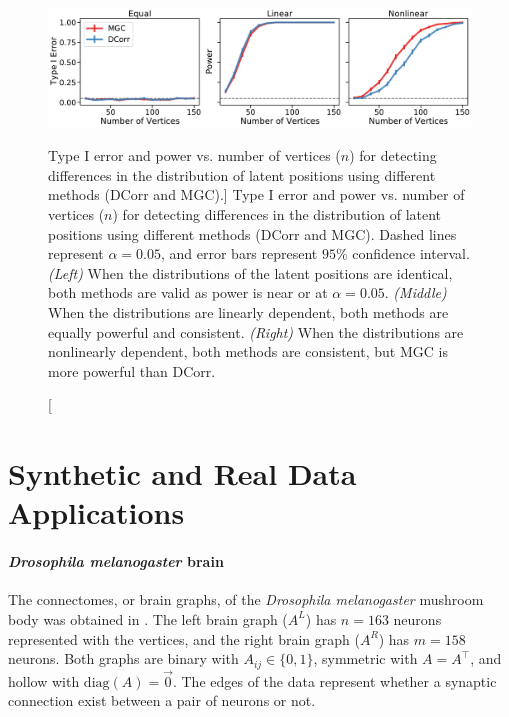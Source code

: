 \begin{figure}[hbt!]
    \centering
    \includegraphics[width=\linewidth]{figures/nonpar/simulations.pdf}
    \caption
    [Type I error and power vs. number of vertices ($n$) for detecting differences in the distribution of latent positions using different methods (DCorr and MGC).]
    {Type I error and power vs. number of vertices ($n$) for detecting differences in the distribution of latent positions using different methods (DCorr and MGC). Dashed lines represent $\alpha=0.05$, and error bars represent $95\%$ confidence interval.
    \textit{(Left)} When the distributions of the latent positions are identical, both methods are valid as power is near or at $\alpha=0.05$. \textit{(Middle)} When the distributions are linearly dependent, both methods are equally powerful and consistent. \textit{(Right)} When the distributions are nonlinearly dependent, both methods are consistent, but MGC is more powerful than DCorr.}
    \label{fig:simulations}
\end{figure}

\section{Synthetic and Real Data Applications}

\paragraph{\textit{Drosophila melanogaster} brain}
The connectomes, or brain graphs, of the \textit{Drosophila melanogaster} mushroom body was obtained in \cite{eichler2017complete}. The left brain graph ($A^L$) has $n=163$ neurons represented with the vertices, and the right brain graph ($A^R$) has $m=158$ neurons. Both graphs are binary with $A_{i j} \in \{0, 1\}$, symmetric with $A= A^\top$, and hollow with $\text{diag}(A) = \vec 0$. The edges of the data represent whether a synaptic connection exist between a pair of neurons or not.

